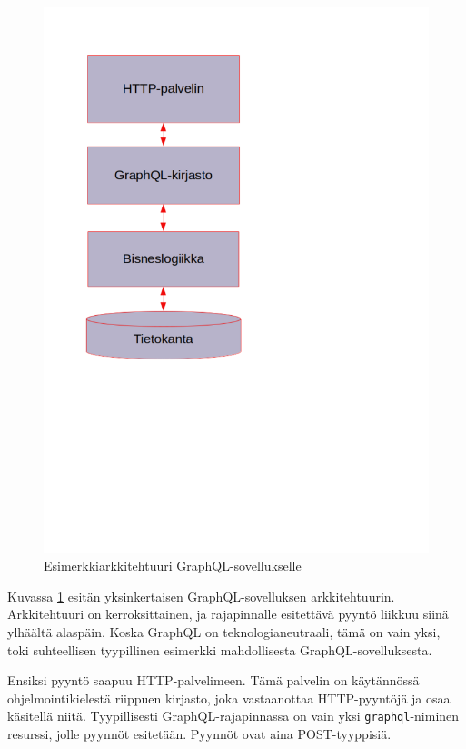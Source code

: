 \begin{figure}
\centering
\includegraphics{illustration/GraphQL-arkkitehtuuri.png}
\caption{\label{graphqlarkkitehtuuri} Esimerkkiarkkitehtuuri
GraphQL-sovellukselle}
\end{figure}

Kuvassa \ref{graphqlarkkitehtuuri} esitän yksinkertaisen
GraphQL-sovelluksen arkkitehtuurin. Arkkitehtuuri on kerroksittainen, ja
rajapinnalle esitettävä pyyntö liikkuu siinä ylhäältä alaspäin. Koska
GraphQL on teknologianeutraali, tämä on vain yksi, toki suhteellisen
tyypillinen esimerkki mahdollisesta GraphQL-sovelluksesta.

Ensiksi pyyntö saapuu HTTP-palvelimeen. Tämä palvelin on käytännössä
ohjelmointikielestä riippuen kirjasto, joka vastaanottaa HTTP-pyyntöjä
ja osaa käsitellä niitä. Tyypillisesti GraphQL-rajapinnassa on vain yksi
\texttt{graphql}-niminen resurssi, jolle pyynnöt esitetään. Pyynnöt ovat
aina POST-tyyppisiä.

